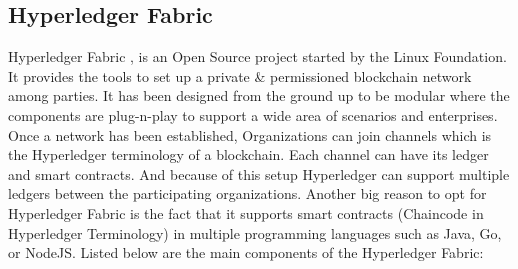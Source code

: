 \subsection{Hyperledger Fabric}
Hyperledger Fabric \cite{ibm-hyperledger}, is an Open Source project started by the Linux Foundation. It provides the tools to set up a private \& permissioned blockchain network among parties. It has been designed from the ground up to be modular where the components are plug-n-play to support a wide area of scenarios and enterprises. Once a network has been established, Organizations can join channels which is the Hyperledger terminology of a blockchain. Each channel can have its ledger and smart contracts. And because of this setup Hyperledger can support multiple ledgers between the participating organizations. Another big reason to opt for Hyperledger Fabric is the fact that it supports smart contracts (Chaincode in Hyperledger Terminology) in multiple programming languages such as Java, Go, or NodeJS. Listed below are the main components of the Hyperledger Fabric:
